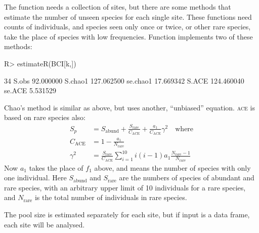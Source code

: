 \documentclass[article,nojss]{jss}
\begin{document}
The  function needs a collection of sites, but there
are some methods that estimate the number of unseen species for each
single site.  These functions need counts of individuals, and species
seen only once or twice, or other rare species, take the place of
species with low frequencies.  Function  implements
two of these methods:
\begin{Schunk}
\begin{Sinput}
R> estimateR(BCI[k,])
\end{Sinput}
\begin{Soutput}
                 34
S.obs     92.000000
S.chao1  127.062500
se.chao1  17.669342
S.ACE    124.460040
se.ACE     5.531529
\end{Soutput}
\end{Schunk}
Chao's method is similar as above, but uses another, ``unbiased''
equation. \textsc{ace} is based on rare species also:
\begin{equation}
\begin{split}
S_p &= S_\mathrm{abund} + \frac{S_\mathrm{rare}}{C_\mathrm{ACE}} +
\frac{a_1}{C_\mathrm{ACE}} \gamma^2 \quad \text{where}\\
C_\mathrm{ACE} &= 1 - \frac{a_1}{N_\mathrm{rare}}\\
\gamma^2 &= \frac{S_\mathrm{rare}}{C_\mathrm{ACE}} \sum_{i=1}^{10} i
(i-1) a_1 \frac{N_\mathrm{rare} - 1}{N_\mathrm{rare}}
\end{split}
\end{equation}
Now $a_1$ takes the place of $f_1$ above, and means the number of
species with only one individual.
Here $S_\mathrm{abund}$ and $S_\mathrm{rare}$ are the numbers of
species of abundant and rare species, with an arbitrary upper limit of
10 individuals for a rare species, and $N_\mathrm{rare}$ is the total
number of individuals in rare species.

The pool size
is estimated separately for each site, but if input is a data frame,
each site will be analysed.
\end{document}

